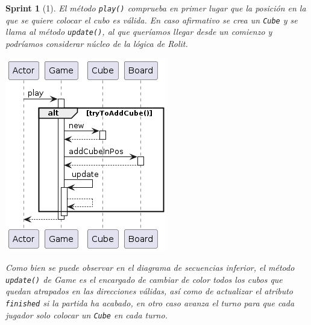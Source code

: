 \documentclass[12pt,a4paper,openright]{book}
\theoremstyle{break}
\newtheorem*{sprint}{Sprint}
\begin{document}
\begin{sprint}[1]
El método \texttt{play()} comprueba en primer lugar que la posición en la que se quiere colocar el cubo es válida. En caso afirmativo se crea un \texttt{Cube} y se llama al método \texttt{update()}, al que queríamos llegar desde un comienzo y podríamos considerar núcleo de la lógica de Rolit.
\begin{center}
\includegraphics[scale=0.55]{play-game.png}
\end{center}
Como bien se puede observar en el diagrama de secuencias inferior, el método
\texttt{update()} de Game  es el encargado de cambiar de color todos los cubos que quedan atrapados en las direcciones válidas, así como de actualizar el atributo \texttt{finished} si la partida ha acabado, en otro caso avanza el turno para que cada jugador solo colocar un \texttt{Cube} en cada turno.
\begin{center}

\end{center}
\end{sprint}
\end{document}
